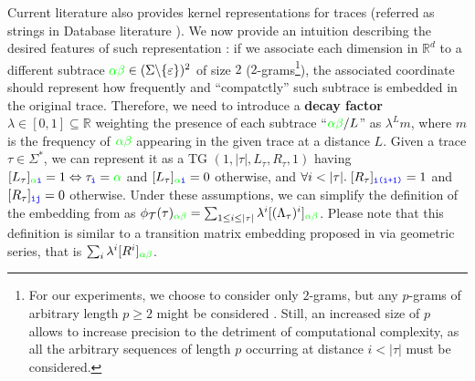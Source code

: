 {Current literature also provides kernel representations for traces (referred as strings in Database literature \cite{LodhiSSCW02,Raedt,GartnerFW03}). We now provide an intuition describing the desired features of such representation \cite{LodhiSSCW02}: if we associate each dimension in $\mathbb{R}^d$ to a different subtrace ${\color{green}\alpha\beta}\in(\Sigma\backslash\{\varepsilon\})^2$ of size $2$ ($2$-grams\footnote{\label{fn:caveat}For our experiments, we choose to consider only $2$-grams, but any $p$-grams of arbitrary length $p\geq 2$ might be considered \cite{Gartner03}. Still, an increased size of $p$ allows to increase precision to the detriment of computational complexity, as all the arbitrary sequences of length $p$ occurring at distance $i<|\tau|$ must be considered.}), the associated coordinate should represent how frequently and ``compatctly'' such subtrace is embedded in the original trace. Therefore, we need to introduce a \textbf{decay factor} $\lambda\in[0,1]\subseteq\mathbb{R}$ weighting the presence of each subtrace ``${\color{green}\alpha\beta}/L$'' as $\lambda^Lm$, where $m$ is the frequency of $\color{green}\alpha\beta$ appearing in the given trace at a distance $L$. Given a trace $\tau\in\Sigma^*$, we can represent it as a TG \cite{Myers1989} $(1,{|\tau|},L_\tau,R_\tau,1)$ having $[L_\tau]_{{\color{green}\alpha}\texttt{\color{blue}i}}=1\Leftrightarrow \tau_{\texttt{\color{blue}i}}={\color{green}\alpha}$ and $[L_\tau]_{{\color{green}\alpha}\texttt{\color{blue}i}}=0$ otherwise, and $\forall i<|\tau|.\; [R_\tau]_{\texttt{\color{blue}i(i+1)}}=1 $ and $[R_\tau]_{\texttt{\color{blue}ij}}=0$ otherwise. Under these assumptions, we can simplify the definition of the embedding from \cite{LodhiSSCW02,Raedt} as $\phi_{\mathcal{T}}(\tau)_{{\color{green}\alpha\beta}}=\sum_{1\leq i\leq |\tau|}\lambda^i[(\Lambda_\tau)^i]_{\color{green}\alpha\beta}$. Please note that this definition is similar to a transition matrix embedding proposed in \cite{GartnerFW03} via geometric series, that is $\sum_i\lambda^i[R^i]_{\color{green}\alpha\beta}$. 

}
